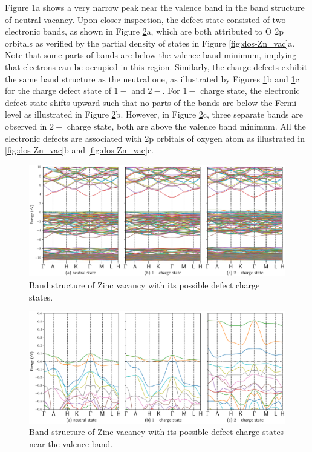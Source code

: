 Figure \ref{fig:band-Zn_vac}a shows a very narrow peak near the valence band in the band structure of neutral  vacancy. Upon closer inspection, the defect state consisted of two electronic bands, as shown in Figure \ref{fig:bandclose-Zn_vac}a, which are both attributed to O 2p orbitals as verified by the partial density of states in Figure \ref{fig:dos-Zn_vac}a. Note that some parts of bands are below the valence band minimum, implying that electrons can be occupied in this region. Similarly, the charge defects exhibit the same band structure as the neutral one, as illustrated by Figures \ref{fig:band-Zn_vac}b and \ref{fig:band-Zn_vac}c for the charge defect state of $1-$ and $2-$.  For $1-$ charge state, the electronic defect state shifts upward such that no parts of the bands are below the Fermi level as illustrated in Figure \ref{fig:bandclose-Zn_vac}b. However, in Figure \ref{fig:bandclose-Zn_vac}c, three separate bands are observed in $2-$ charge state, both are above the valence band minimum. All the electronic defects are associated with 2p orbitals of oxygen atom as illustrated in \ref{fig:dos-Zn_vac}b and \ref{fig:dos-Zn_vac}c.

\begin{figure}[tbph!]
	\centering
	\includegraphics[width=1\textwidth]{"images/rnd/Zn_vac-band"}
	\caption[Band structure of Zinc vacancy with its possible defect charge states]{Band structure of Zinc vacancy with its possible defect charge states. }
	\label{fig:band-Zn_vac}
\end{figure}

\begin{figure}[tbph!]
	\centering
	\includegraphics[width=1\textwidth]{"images/rnd/Zn_vac-bandclose"}
	\caption[Band structure of Zinc vacancy with its possible defect charge states near the valence band]{Band structure of Zinc vacancy with its possible defect charge states near the valence band. }
	\label{fig:bandclose-Zn_vac}
\end{figure}

